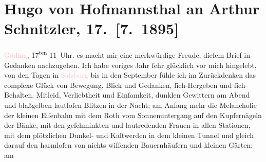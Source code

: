 

               \section[Hugo von Hofmannsthal an Arthur Schnitzler, 17. {[}7. 1895{]}]{ Hugo von Hofmannsthal an Arthur Schnitzler, 17. {[}7. 1895{]}}\nopagebreak{}\rehead{ }\normalsize\beginnumbering{} \toendnotes[C]{\smallbreak\pagebreak[2]} 
\toendnotes[C]{\smallbreak}\pstart
           \raggedleft{}{\pb}\textcolor{pink}{Göding}{}\ledrightnote{\textcolor{pink}{Hodonín}}, 17\textsuperscript{ten}{ }11 Uhr. \pend
           \pstart
           \raggedleft{}\textcolor{gray}{\textbf{\strikeout{\textcolor{pink}{Salesianergasse 12}{}\ledrightnote{\textcolor{pink}{Salesianergasse}}}}}\pend
           \pstart
           es macht mir eine merkwürdige Freude, dieſem Brief in Gedanken nachzugehen. Ich
                    habe voriges Jahr ſehr glücklich vor mich hingelebt, von den Tagen in \textcolor{pink}{Salzburg}{}\ledrightnote{\textcolor{pink}{Salzburg}} bis in den September fühle
                    ich im Zurückdenken das complexe Glück von Bewegung, Blick und Gedanken,
                    ſich-Hergeben und ſich-Behalten, Mitleid, Verliebtheit und Einſamkeit, dunklen
                    Gewittern am Abend und blaßgelben lautloſen Blitzen in der Nacht; am Anfang mehr
                    die Melancholie der kleinen Eiſenbahn mit dem Roth vom Sonnenuntergang auf den
                    Kupfernägeln der Bänke, mit den geſchminkten und lautredenden {\pb}Frauen in allen Stationen,
                    mit dem plötzlichen Dunkel- und Kaltwerden in dem kleinen Tunnel und gleich
                    darauf den harmloſen von nichts wiſſenden Bauernhäuſern und kleinen Gärten; am
